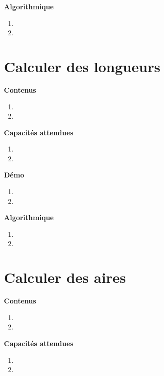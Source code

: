 \documentclass[10pt,a4paper]{article}
\begin{document}
\textbf{Algorithmique}

\begin{enumerate}
\item 
\item 
\end{enumerate}

\section{Calculer des longueurs}

\textbf{Contenus}

\begin{enumerate} 
\item 
\item 
\end{enumerate}


\textbf{Capacités attendues}

\begin{enumerate}
\item 
\item 
\end{enumerate}

\textbf{Démo}

\begin{enumerate}
\item 
\item 
\end{enumerate}

\textbf{Algorithmique}

\begin{enumerate}
\item 
\item 
\end{enumerate}

\section{Calculer des aires}

\textbf{Contenus}

\begin{enumerate} 
\item 
\item 
\end{enumerate}


\textbf{Capacités attendues}

\begin{enumerate}
\item 
\item 
\end{enumerate}
\end{document}
